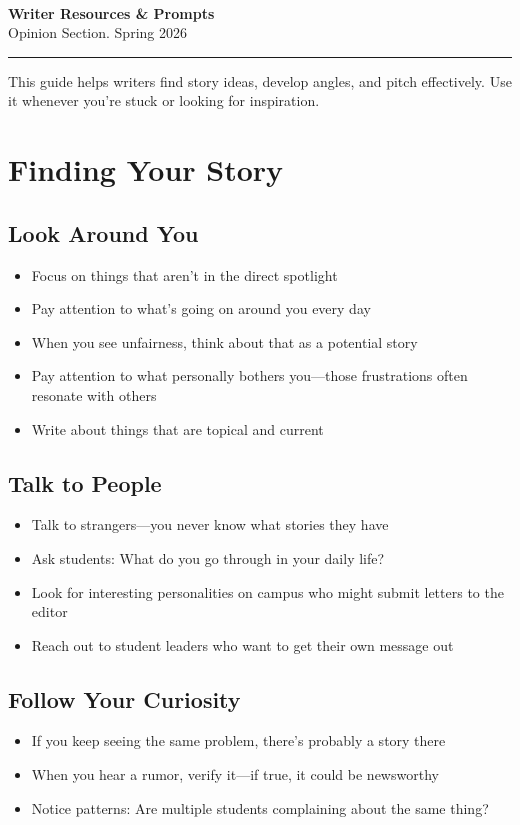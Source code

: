 \documentclass[12pt]{article}
\newcommand{\doctitle}{%
    \noindent{\LARGE\bfseries Daily Gamecock \textit{Opinion}}\\[2pt]
    {\LARGE\bfseries Writer Resources \& Prompts}\\[4pt]
    {\normalsize Opinion Section. Spring 2026}\\[-2pt]
    \noindent\rule{\textwidth}{1pt}
    \vspace{8pt}
}
\begin{document}
\thispagestyle{plain}

\doctitle

\begin{keybox}
This guide helps writers find story ideas, develop angles, and pitch effectively. Use it whenever you're stuck or looking for inspiration.
\end{keybox}

\section*{Finding Your Story}

\subsection*{Look Around You}
\begin{itemize}[leftmargin=*]
    \item Focus on things that aren't in the direct spotlight
    \item Pay attention to what's going on around you every day
    \item When you see unfairness, think about that as a potential story
    \item Pay attention to what personally bothers you---those frustrations often resonate with others
    \item Write about things that are topical and current
\end{itemize}

\subsection*{Talk to People}
\begin{itemize}[leftmargin=*]
    \item Talk to strangers---you never know what stories they have
    \item Ask students: What do you go through in your daily life?
    \item Look for interesting personalities on campus who might submit letters to the editor
    \item Reach out to student leaders who want to get their own message out
\end{itemize}

\subsection*{Follow Your Curiosity}
\begin{itemize}[leftmargin=*]
    \item If you keep seeing the same problem, there's probably a story there
    \item When you hear a rumor, verify it---if true, it could be newsworthy
    \item Notice patterns: Are multiple students complaining about the same thing?
\end{itemize}
\end{document}
